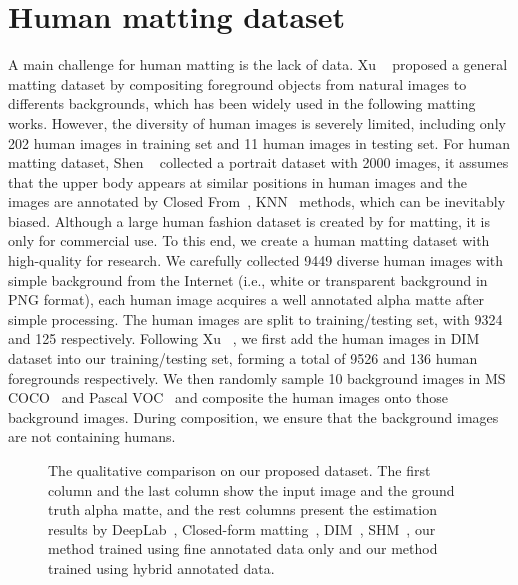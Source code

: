 \documentclass[10pt,twocolumn,letterpaper]{article}
\begin{document}
\section{Human matting dataset}

A main challenge for human matting is the lack of data. Xu \etal~\cite{xu2017deep} proposed a general matting dataset by compositing foreground objects from natural images to differents backgrounds, which has been widely used in the following matting works\cite{Cai_2019_ICCV,lutz2018alphagan,Zhang_2019_CVPR}. However, the diversity of human images is severely limited, including only 202 human images in training set and 11 human images in testing set. For human matting dataset, Shen \etal~\cite{shen2016deep} collected a portrait dataset with 2000 images, it assumes that the upper body appears at similar positions in human images and the images are annotated by Closed From~\cite{levin2007closed}, KNN~\cite{chen2013knn} methods, which can be inevitably biased. Although a large human fashion dataset is created by \cite{chen2018semantic} for matting, it is only for commercial use. To this end, we create a human matting dataset with high-quality for research. We carefully collected 9449 diverse human images with simple background from the Internet (i.e., white or transparent background in PNG format), each human image acquires a well annotated alpha matte after simple processing. The human images are split to training/testing set, with 9324 and 125 respectively. Following Xu \etal~\cite{xu2017deep}, we first add the human images in DIM dataset\cite{xu2017deep} into our training/testing set, forming a total of 9526 and 136 human foregrounds respectively. We then randomly sample 10 background images in MS COCO~\cite{lin2014microsoft} and Pascal VOC~\cite{everingham2010pascal} and composite the human images onto those background images. During composition, we ensure that the background images are not containing humans.

\begin{figure*}[t!]
  \centering
  \caption{The qualitative comparison on our proposed dataset. The first column and the last column show the input image and the ground truth alpha matte, and the rest columns present the estimation results by DeepLab~\cite{chen2017rethinking}, Closed-form matting~\cite{levin2007closed}, DIM~\cite{xu2017deep}, SHM~\cite{chen2018semantic}, our method trained using fine annotated data only and our method trained using hybrid annotated data.}
  \label{fig:quality_cmp}
\end{figure*}
\end{document}
